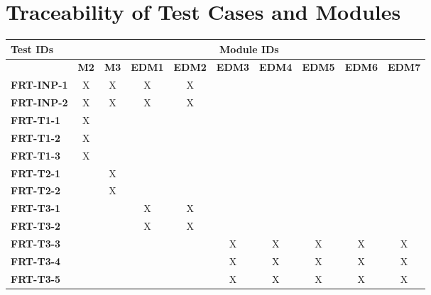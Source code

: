 \documentclass[12pt, titlepage]{article}
\begin{document}
\section{Traceability of Test Cases and Modules}
\begin{longtable}{|l|ccccccccc|}
    \hline
    \textbf{Test IDs}  & \multicolumn{9}{c|}{\textbf{Module IDs}}                                               \\
    \hline
    ~                  & \textbf{M2}                              & \textbf{M3} & \textbf{EDM1} & \textbf{EDM2} & \textbf{EDM3} & \textbf{EDM4} & \textbf{EDM5} & \textbf{EDM6} & \textbf{EDM7} \\
    \hline
    \textbf{FRT-INP-1}  & X                                        & X           & X             & X             & ~ & ~ & ~ & ~ & ~\\
    \textbf{FRT-INP-2}  & X                                        & X           & X             & X             & ~ & ~ & ~ & ~ & ~\\
    \textbf{FRT-T1-1}  & X                                        & ~           & ~             & ~             & ~ & ~ & ~ & ~ & ~\\
    \textbf{FRT-T1-2}  & X                                        & ~           & ~             & ~             & ~ & ~ & ~ & ~ & ~\\
    \textbf{FRT-T1-3}  & X                                        & ~           & ~             & ~             & ~ & ~ & ~ & ~ & ~\\
    \textbf{FRT-T2-1}  & ~                                        & X           & ~             & ~             & ~ & ~ & ~ & ~ & ~\\
    \textbf{FRT-T2-2}  & ~                                        & X           & ~             & ~             & ~ & ~ & ~ & ~ & ~\\
    \textbf{FRT-T3-1}  & ~                                        & ~           & X             & X             & ~ & ~ & ~ & ~ & ~\\
    \textbf{FRT-T3-2}  & ~                                        & ~           & X             & X             & ~ & ~ & ~ & ~ & ~\\
    \textbf{FRT-T3-3}  & ~                                        & ~           & ~             & ~             & X & X & X & X & X\\
    \textbf{FRT-T3-4}  & ~                                        & ~           & ~             & ~             & X & X & X & X & X\\
    \textbf{FRT-T3-5}  & ~                                        & ~           & ~             & ~             & X & X & X & X & X\\
    \hline
\end{longtable}
\end{document}
